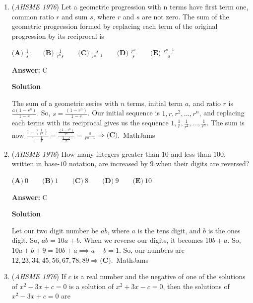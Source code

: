 \begin{enumerate}
\textbf{Solution}

The lengths to the side are $1, \sqrt{2^2+1^2}, \sqrt{2^2+1^2}, 1$, respectively. Therefore, the sum is $\boxed{\textbf{(E) } 2+2\sqrt{5}}$.~MathJams

 


 


	\item (\textit{AHSME 1976}) Let a geometric progression with n terms have first term one, common ratio $r$ and sum $s$, where $r$ and $s$ are not zero. 
The sum of the geometric progression formed by replacing each term of the original progression by its reciprocal is


 $\textbf{(A) }\frac{1}{s}\qquad \textbf{(B) }\frac{1}{r^ns}\qquad \textbf{(C) }\frac{s}{r^{n-1}}\qquad \textbf{(D) }\frac{r^n}{s}\qquad \textbf{(E) } \frac{r^{n-1}}{s}$

 \textbf{Answer: }C



\textbf{Solution}

The sum of a geometric series with $n$ terms, initial term $a$, and ratio $r$ is $\frac{a(1-r^n)}{1-r}$. So, $s=\frac{(1-r^n)}{1-r}$. Our initial sequence is $1, r, r^2, \dots, r^n$, and replacing each terms with its reciprocal gives us the sequence $1, \frac{1}{r}, \frac{1}{r^2}, \dots, \frac{1}{r^n}$. The sum is now $\frac{1-(\frac{1}{r^n})}{1-\frac{1}{r}}=\frac{\frac{(1-r^n)}{r^n}}{\frac{1-r}{r}}=\frac{s}{r^{n-1}}\Rightarrow \textbf{(C)}$.~MathJams

 


	\item (\textit{AHSME 1976}) How many integers greater than $10$ and less than $100$, written in base-$10$ notation, 
are increased by $9$ when their digits are reversed?


 $\textbf{(A)}\ 0 \qquad \textbf{(B)}\ 1 \qquad \textbf{(C)}\ 8 \qquad \textbf{(D)}\ 9 \qquad \textbf{(E)}\ 10$

 \textbf{Answer: }C



\textbf{Solution}

Let our two digit number be $\overline{ab}$, where $a$ is the tens digit, and $b$ is the ones digit. So, $\overline{ab}=10a+b$. When we reverse our digits, it becomes $10b+a$. So, $10a+b+9=10b+a\implies a-b=1$. So, our numbers are $12, 23, 34, 45, 56, 67, 78, 89\Rightarrow \textbf{(C)}$.~MathJams

 


	\item (\textit{AHSME 1976}) If $c$ is a real number and the negative of one of the solutions of $x^2-3x+c=0$ is a solution of $x^2+3x-c=0$, then the solutions of $x^2-3x+c=0$ are



\end{enumerate}
